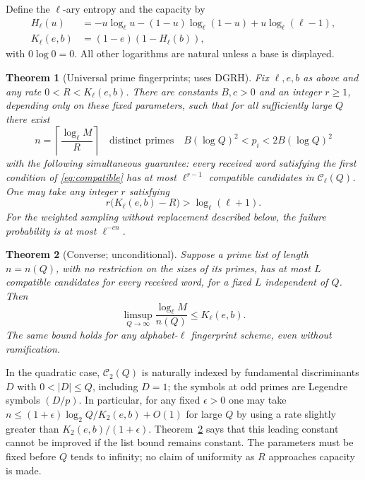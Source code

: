 \documentclass[11pt]{article}
\newtheorem{theorem}{Theorem}[section]
\theoremstyle{remark}\newtheorem{remark}[theorem]{Remark}
\newcommand{\C}{\mathcal C}
\begin{document}
Define the $\ell$-ary entropy and the capacity by
\begin{align*}
H_\ell(u)&=-u\log_\ell u-(1-u)\log_\ell(1-u)+u\log_\ell(\ell-1),\\
K_\ell(e,b)&=(1-e)(1-H_\ell(b)),
\end{align*}
with $0\log 0=0$. All other logarithms are natural unless a base is displayed.

\begin{theorem}[Universal prime fingerprints; uses DGRH]\label{thm:main}
Fix $\ell,e,b$ as above and any rate $0<R<K_\ell(e,b)$. There are constants $B,c>0$ and an integer $r\ge1$, depending only on these fixed parameters, such that for all sufficiently large $Q$ there exist
\[
 n=\left\lceil\frac{\log_\ell M}{R}\right\rceil
\quad\text{distinct primes}\quad
 B(\log Q)^2<p_i<2B(\log Q)^2
\]
with the following simultaneous guarantee: every received word satisfying the first condition of \eqref{eq:compatible} has at most $\ell^{r-1}$ compatible candidates in $\C_\ell(Q)$. One may take any integer $r$ satisfying
\begin{equation}\label{eq:rankchoice}
 r\bigl(K_\ell(e,b)-R\bigr)>\log_\ell(\ell+1).
\end{equation}
For the weighted sampling without replacement described below, the failure probability is at most $\ell^{-cn}$.
\end{theorem}

\begin{theorem}[Converse; unconditional]\label{thm:converse}
Suppose a prime list of length $n=n(Q)$, with no restriction on the sizes of its primes, has at most $L$ compatible candidates for every received word, for a fixed $L$ independent of $Q$. Then
\[
 \limsup_{Q\to\infty}\frac{\log_\ell M}{n(Q)}\le K_\ell(e,b).
\]
The same bound holds for any alphabet-$\ell$ fingerprint scheme, even without ramification.
\end{theorem}

In the quadratic case, $\C_2(Q)$ is naturally indexed by fundamental discriminants $D$ with $0<|D|\le Q$, including $D=1$; the symbols at odd primes are Legendre symbols $(D/p)$. In particular, for any fixed $\epsilon>0$ one may take $n\le (1+\epsilon)\log_2 Q/K_2(e,b)+O(1)$ for large $Q$ by using a rate slightly greater than $K_2(e,b)/(1+\epsilon)$. Theorem~\ref{thm:converse} says that this leading constant cannot be improved if the list bound remains constant. The parameters must be fixed before $Q$ tends to infinity; no claim of uniformity as $R$ approaches capacity is made.
\end{document}
